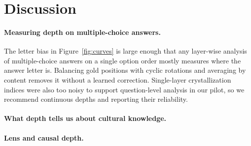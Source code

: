 \section{Discussion}

\paragraph{Measuring depth on multiple-choice answers.}
The letter bias in Figure~\ref{fig:curves} is large enough that any layer-wise analysis of multiple-choice answers on a single option order mostly measures where the answer letter is.
Balancing gold positions with cyclic rotations and averaging by content removes it without a learned correction.
Single-layer crystallization indices were also too noisy to support question-level analysis in our pilot, so we recommend continuous depths and reporting their reliability.

\paragraph{What depth tells us about cultural knowledge.}

\paragraph{Lens and causal depth.}
